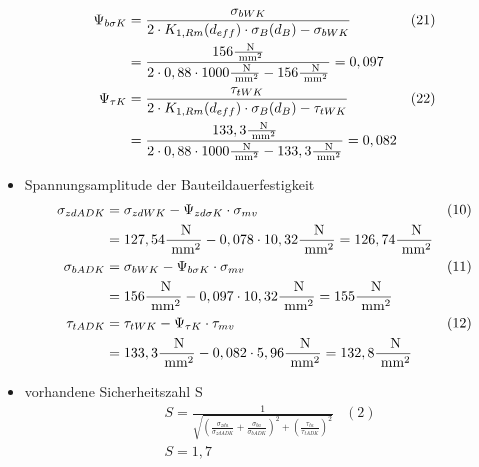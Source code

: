 \begin{itemize}
\begin{align*}
	\Psi_{b \sigma K}&= \frac{\sigma_{bWK}}{2 \cdot  K_{1,Rm} (d_{eff}) \cdot \sigma_B (d_B) -\sigma_{bWK}} &(21) \\
	&=  \frac{156 \frac{\text{ N}}{\text{ mm}^2}}{2 \cdot 0,88 \cdot 1000\frac{\text{ N}}{\text{ mm}^2} - 156 \frac{\text{ N}}{\text{ mm}^2}} = 0,097 \\
	\Psi_{\tau K}&= \frac{\tau_{tWK}}{2 \cdot  K_{1,Rm} (d_{eff}) \cdot \sigma_B (d_B) -\tau_{tWK}} &(22) \\
	&=  \frac{133,3 \frac{\text{ N}}{\text{ mm}^2}}{2 \cdot 0,88 \cdot 1000\frac{\text{ N}}{\text{ mm}^2} - 133,3 \frac{\text{ N}}{\text{ mm}^2}} = 0,082 
	\end{align*}
	\item Spannungsamplitude der Bauteildauerfestigkeit
	\begin{align*}
	\sigma_{zdADK} &= \sigma_{zdWK} - \Psi_{zd \sigma K} \cdot \sigma_{mv} &(10) \\
	&= 127,54\frac{\text{ N}}{\text{ mm}^2} - 0,078 \cdot 10,32 \frac{\text{ N}}{\text{ mm}^2} = 126,74 \frac{\text{ N}}{\text{ mm}^2} \\
	\sigma_{bADK} &= \sigma_{bWK} - \Psi_{b \sigma K} \cdot \sigma_{mv} &(11) \\
	&= 156\frac{\text{ N}}{\text{ mm}^2} - 0,097 \cdot 10,32 \frac{\text{ N}}{\text{ mm}^2} = 155 \frac{\text{ N}}{\text{ mm}^2} \\
	\tau_{tADK} &= \tau_{tWK} - \Psi_{ \tau K} \cdot \tau_{mv} &(12) \\
	&= 133,3\frac{\text{ N}}{\text{ mm}^2} - 0,082 \cdot 5,96 \frac{\text{ N}}{\text{ mm}^2} = 132,8 \frac{\text{ N}}{\text{ mm}^2} 
	\end{align*}
	\item vorhandene Sicherheitszahl S 
	\begin{align*}
		&S= \frac{1}{\sqrt{\left( \frac{\sigma_{zda}}{\sigma_{zdADK}} +\frac{\sigma_{ba}}{\sigma_{bADK}} \right)^2 +\left( \frac{\tau_{ta}}{\tau_{tADK}} \right)^2 }} &(2) \\
		&S=  1,7 
	\end{align*}
\end{itemize}
